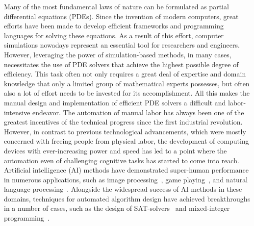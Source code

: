 Many of the most fundamental laws of nature can be formulated as partial differential equations (PDEs).
Since the invention of modern computers, great efforts have been made to develop efficient frameworks and programming languages for solving these equations.
As a result of this effort, computer simulations nowadays represent an essential tool for researchers and engineers.
However, leveraging the power of simulation-based methods, in many cases, necessitates the use of PDE solvers that achieve the highest possible degree of efficiency.
This task often not only requires a great deal of expertise and domain knowledge that only a limited group of mathematical experts possesses, but often also a lot of effort needs to be invested for its accomplishment.
All this makes the manual design and implementation of efficient PDE solvers a difficult and labor-intensive endeavor.
The automation of manual labor has always been one of the greatest incentives of the technical progress since the first industrial revolution.
However, in contrast to previous technological advancements, which were mostly concerned with freeing people from physical labor, the development of computing devices with ever-increasing power and speed has led to a point where the automation even of challenging cognitive tasks has started to come into reach.
Artificial intelligence (AI) methods have demonstrated super-human performance in numerous applications, such as image processing~\cite{krizhevsky2017imagenet}, game playing~\cite{schrittwieser2020mastering,reed2022generalist}, and natural language processing~\cite{brown2020language}.
Alongside the widespread success of AI methods in these domains, techniques for automated algorithm design have achieved breakthroughs in a number of cases, such as the design of SAT-solvers~\cite{khudabukhsh2016satenstein} and mixed-integer programming~\cite{hutter2010automated}.
